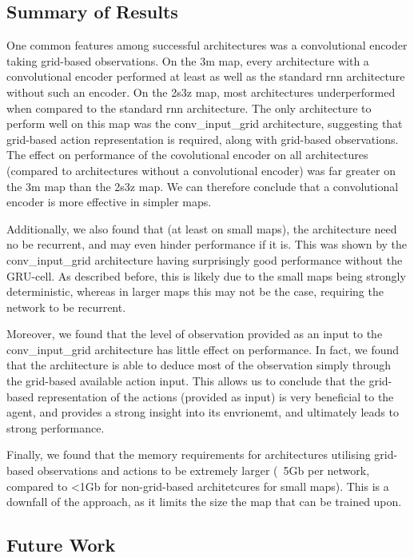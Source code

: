 \subsection{Summary of Results}

One common features among successful architectures was a convolutional encoder taking grid-based observations. On the 3m map, every architecture with a convolutional encoder performed at least as well as the standard rnn architecture without such an encoder. On the 2s3z map, most architectures underperformed when compared to the standard rnn architecture. The only architecture to perform well on this map was the conv\_input\_grid architecture, suggesting that grid-based action representation is required, along with grid-based observations. The effect on performance of the covolutional encoder on all architectures (compared to architectures without a convolutional encoder) was far greater on the 3m map than the 2s3z map. We can therefore conclude that a convolutional encoder is more effective in simpler maps.

Additionally, we also found that (at least on small maps), the architecture need no be recurrent, and may even hinder performance if it is. This was shown by the conv\_input\_grid architecture having surprisingly good performance without the GRU-cell. As described before, this is likely due to the small maps being strongly deterministic, whereas in larger maps this may not be the case, requiring the network to be recurrent.

Moreover, we found that the level of observation provided as an input to the conv\_input\_grid architecture has little effect on performance. In fact, we found that the architecture is able to deduce most of the observation simply through the grid-based available action input. This allows us to conclude that the grid-based representation of the actions (provided as input) is very beneficial to the agent, and provides a strong insight into its envrionemt, and ultimately leads to strong performance.

Finally, we found that the memory requirements for architectures utilising grid-based observations and actions to be extremely larger (~5Gb per network, compared to <1Gb for non-grid-based architetcures for small maps). This is a downfall of the approach, as it limits the size the map that can be trained upon.





\subsection{Future Work}

